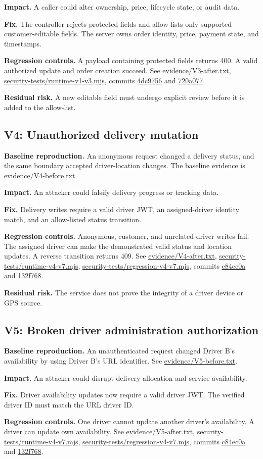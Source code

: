 \documentclass[11pt]{article}
\newcommand{\evidence}[1]{{\small\url{#1}}}
\newcommand{\finding}[1]{\subsection{#1}}
\newcommand{\baseline}{\textbf{Baseline reproduction.} }
\newcommand{\impact}{\textbf{Impact.} }
\newcommand{\fix}{\textbf{Fix.} }
\newcommand{\control}{\textbf{Regression controls.} }
\newcommand{\residual}{\textbf{Residual risk.} }
\begin{document}
\impact A caller could alter ownership, price, lifecycle state, or audit data.

\fix The controller rejects protected fields and allow-lists only supported customer-editable fields. The server owns order identity, price, payment state, and timestamps.

\control A payload containing protected fields returns 400. A valid authorized update and order creation succeed. See \evidence{evidence/V3-after.txt}, \evidence{security-tests/runtime-v1-v3.mjs}, commits \evidence{4dc9756} and \evidence{720a077}.

\residual A new editable field must undergo explicit review before it is added to the allow-list.

\finding{V4: Unauthorized delivery mutation}
\baseline An anonymous request changed a delivery status, and the same boundary accepted driver-location changes. The baseline evidence is \evidence{evidence/V4-before.txt}.

\impact An attacker could falsify delivery progress or tracking data.

\fix Delivery writes require a valid driver JWT, an assigned-driver identity match, and an allow-listed status transition.

\control Anonymous, customer, and unrelated-driver writes fail. The assigned driver can make the demonstrated valid status and location updates. A reverse transition returns 409. See \evidence{evidence/V4-after.txt}, \evidence{security-tests/runtime-v4-v7.mjs}, \evidence{security-tests/regression-v4-v7.mjs}, commits \evidence{c84ec0a} and \evidence{132f768}.

\residual The service does not prove the integrity of a driver device or GPS source.

\finding{V5: Broken driver administration authorization}
\baseline An unauthenticated request changed Driver B's availability by using Driver B's URL identifier. See \evidence{evidence/V5-before.txt}.

\impact An attacker could disrupt delivery allocation and service availability.

\fix Driver availability updates now require a valid driver JWT. The verified driver ID must match the URL driver ID.

\control One driver cannot update another driver's availability. A driver can update own availability. See \evidence{evidence/V5-after.txt}, \evidence{security-tests/runtime-v4-v7.mjs}, \evidence{security-tests/regression-v4-v7.mjs}, commits \evidence{c84ec0a} and \evidence{132f768}.
\end{document}
